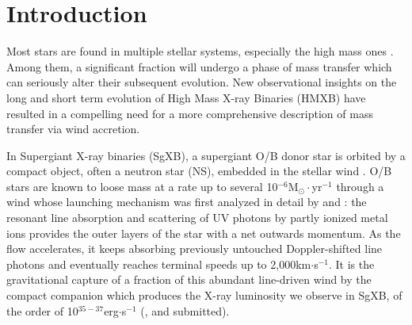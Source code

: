 \documentclass{aa}
\makeatletter
\newcommand{\sgx}{SgXB\xspace}
\newcommand*{\hmxb}{HMXB\@\xspace}
\newcommand*{\rlof}{RLOF\@\xspace}
\newcommand*{\ns}{NS\@\xspace}
\makeatother
\begin{document}
\section{Introduction}

Most stars are found in multiple stellar systems, especially the high mass ones \citep{Duchene2013}. Among them, a significant fraction will undergo a phase of mass transfer which can seriously alter their subsequent evolution. New observational insights on the long \citep{Abbott2016a} and short term \citep{Grinberg2017} evolution of High Mass X-ray Binaries (\hmxb) have resulted in a compelling need for a more comprehensive description of mass transfer via wind accretion. 


In Supergiant X-ray binaries (\sgx), a supergiant O/B donor star is orbited by a compact object, often a neutron star (\ns), embedded in the stellar wind \citep[for a recent review, see][]{Martinez-Nunez2017}. O/B stars are known to loose mass at a rate up to several 10$^{-6}$M$_{\odot}\cdot$yr$^{-1}$ through a wind whose launching mechanism was first analyzed in detail by \cite{Lucy1970} and \cite{Castor1975} : the resonant line absorption and scattering of UV photons by partly ionized metal ions provides the outer layers of the star with a net outwards momentum. As the flow accelerates, it keeps absorbing previously untouched Doppler-shifted line photons and eventually reaches terminal speeds up to 2,000km$\cdot$s$^{-1}$. It is the gravitational capture of a fraction of this abundant line-driven wind by the compact companion which produces the X-ray luminosity we observe in \sgx, of the order of 10$^{35-37}$erg$\cdot$s$^{-1}$ (\citealt{Walter15}, \citealt{Martinez-Nunez2017} and \citealt{Furst2018} submitted).
\end{document}
